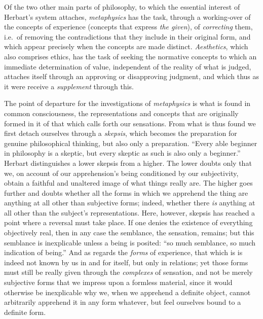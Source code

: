 Of the two other main parts of philosophy, to which the essential
interest of Herbart's system attaches, \emph{metaphysics} has the task,
through a working-over of the concepts of experience (concepts that
express \emph{the given}), of \emph{correcting} them, i.e.\ of removing
the contradictions that they include in their original form, and which
appear precisely when the concepts are made distinct.
\emph{Aesthetics}, which also comprises ethics, has the task of seeking
the normative concepts to which an immediate determination of value,
independent of the reality of what is judged, attaches itself through
an approving or disapproving judgment, and which thus as it were
receive a \emph{supplement} through this.

\divrule

The point of departure for the investigations of \emph{metaphysics} is
what is found in common consciousness, the representations and concepts
that are originally formed in it of that which calls forth our
sensations. From what is thus found we first detach ourselves through a
\emph{skepsis}, which becomes the preparation for genuine philosophical
thinking, but also only a preparation. ``Every able beginner in
philosophy is a skeptic, but every skeptic as such is also only a
beginner.'' Herbart distinguishes a lower skepsis from a higher. The
lower doubts only that we, on account of our apprehension's being
conditioned by our subjectivity, obtain a faithful and unaltered image of
what things really are. The higher goes further and doubts whether all
the forms in which we apprehend the thing are anything at all other than
subjective forms; indeed, whether there \emph{is} anything at all other
than the subject's representations. Here, however, skepsis has reached a
point where a reversal must take place. If one denies the existence of
everything objectively real, then in any case the semblance, the
sensation, remains; but this semblance is inexplicable unless a being is
posited: ``so much semblance, so much indication of being.'' And as
regards the \emph{forms} of experience, that which is is indeed not known
by us in and for itself, but only in relations; yet those forms must
still be really given through the \emph{complexes} of sensation, and not
be merely subjective forms that we impress upon a formless material,
since it would otherwise be inexplicable why we, when we apprehend a
definite object, cannot arbitrarily apprehend it in any form whatever,
but feel ourselves bound to a definite form.

